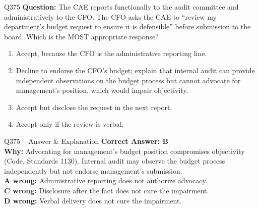 \documentclass[aspectratio=169,10pt]{beamer}
\begin{document}
	\begin{frame}[t]{Q375}
		\small
		\textbf{Question:} The CAE reports functionally to the audit committee and administratively to the CFO. The CFO asks the CAE to ``review my department's budget request to ensure it is defensible'' before submission to the board. Which is the MOST appropriate response?
		\begin{enumerate}[label=\Alph*.,itemsep=1pt,topsep=2pt]
			\item Accept, because the CFO is the administrative reporting line.
			\item Decline to endorse the CFO's budget; explain that internal audit can provide independent observations on the budget process but cannot advocate for management's position, which would impair objectivity.
			\item Accept but disclose the request in the next report.
			\item Accept only if the review is verbal.
		\end{enumerate}
	\end{frame}
	
	\begin{frame}[t]{Q375 -- Answer \& Explanation}
		\small
		\textbf{Correct Answer: B} \\[4pt]
		\textbf{Why:} Advocating for management's budget position compromises objectivity (Code, Standards 1130). Internal audit may observe the budget process independently but not endorse management's submission. \\[4pt]
		\textbf{A wrong:} Administrative reporting does not authorize advocacy. \\[2pt]
		\textbf{C wrong:} Disclosure after the fact does not cure the impairment. \\[2pt]
		\textbf{D wrong:} Verbal delivery does not cure the impairment.
	\end{frame}
	
\end{document}
